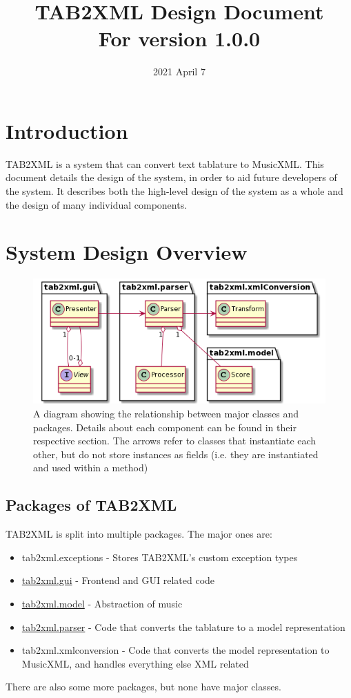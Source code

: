 \documentclass[11pt]{article}
\date{2021 April 7}
\title{TAB2XML Design Document\\\medskip
\large For version 1.0.0}
\begin{document}
\maketitle
\tableofcontents

\newpage

\section{Introduction}
\label{sec:orge685530}
TAB2XML is a system that can convert text tablature to MusicXML.  This document details the design of the system, in order to aid future developers of the system.  It describes both the high-level design of the system as a whole and the design of many individual components.
\section{System Design Overview}
\label{sec:org437d2ce}
\begin{figure}[htbp]
\centering
\includegraphics[width=.9\linewidth]{./Diagrams/full-system-diagram.png}
\caption{A diagram showing the relationship between major classes and packages.  Details about each component can be found in their respective section.  The arrows refer to classes that instantiate each other, but do not store instances as fields (i.e. they are instantiated and used within a method)}
\end{figure}

\subsection{Packages of TAB2XML}
\label{sec:orgd0b8112}
TAB2XML is split into multiple packages.  The major ones are:
\begin{itemize}
\item tab2xml.exceptions - Stores TAB2XML's custom exception types
\item \hyperref[sec:org119be89]{tab2xml.gui} - Frontend and GUI related code
\item \hyperref[sec:org3fd5d01]{tab2xml.model} - Abstraction of music
\item \hyperref[sec:orgbc59981]{tab2xml.parser} - Code that converts the tablature to a model representation
\item tab2xml.xmlconversion - Code that converts the model representation to MusicXML, and handles everything else XML related
\end{itemize}
There are also some more packages, but none have major classes.
\end{document}

